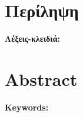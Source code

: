 \chapter*{Περίληψη}
\label{ch:abstract-el}

\vspace{1em}

\textbf{Λέξεις-κλειδιά:}


\chapter*{Abstract}
\label{ch:abstract-en}

\vspace{1em}

\textbf{Keywords:}

